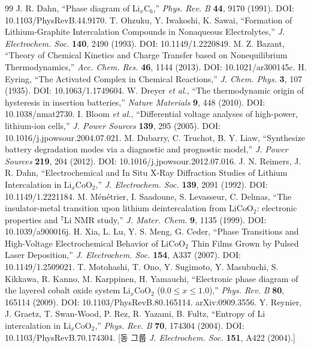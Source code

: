 \documentclass[11pt,a4paper]{article}
\begin{document}
\begin{thebibliography}{99}
 J. R. Dahn, ``Phase diagram of Li$_x$C$_6$,'' \emph{Phys. Rev. B} \textbf{44}, 9170 (1991). DOI: 10.1103/PhysRevB.44.9170.
 T. Ohzuku, Y. Iwakoshi, K. Sawai, ``Formation of Lithium-Graphite Intercalation Compounds in Nonaqueous Electrolytes,'' \emph{J. Electrochem. Soc.} \textbf{140}, 2490 (1993). DOI: 10.1149/1.2220849.
 M. Z. Bazant, ``Theory of Chemical Kinetics and Charge Transfer based on Nonequilibrium Thermodynamics,'' \emph{Acc. Chem. Res.} \textbf{46}, 1144 (2013). DOI: 10.1021/ar300145c.
 H. Eyring, ``The Activated Complex in Chemical Reactions,'' \emph{J. Chem. Phys.} \textbf{3}, 107 (1935). DOI: 10.1063/1.1749604.
 W. Dreyer \emph{et al.}, ``The thermodynamic origin of hysteresis in insertion batteries,'' \emph{Nature Materials} \textbf{9}, 448 (2010). DOI: 10.1038/nmat2730.
 I. Bloom \emph{et al.}, ``Differential voltage analyses of high-power, lithium-ion cells,'' \emph{J. Power Sources} \textbf{139}, 295 (2005). DOI: 10.1016/j.jpowsour.2004.07.021.
 M. Dubarry, C. Truchot, B. Y. Liaw, ``Synthesize battery degradation modes via a diagnostic and prognostic model,'' \emph{J. Power Sources} \textbf{219}, 204 (2012). DOI: 10.1016/j.jpowsour.2012.07.016.
 J. N. Reimers, J. R. Dahn, ``Electrochemical and In Situ X-Ray Diffraction Studies of Lithium Intercalation in Li$_x$CoO$_2$,'' \emph{J. Electrochem. Soc.} \textbf{139}, 2091 (1992). DOI: 10.1149/1.2221184.
 M. M{\'e}n{\'e}trier, I. Saadoune, S. Levasseur, C. Delmas, ``The insulator-metal transition upon lithium deintercalation from LiCoO$_2$: electronic properties and $^7$Li NMR study,'' \emph{J. Mater. Chem.} \textbf{9}, 1135 (1999). DOI: 10.1039/a900016j.
 H. Xia, L. Lu, Y. S. Meng, G. Ceder, ``Phase Transitions and High-Voltage Electrochemical Behavior of LiCoO$_2$ Thin Films Grown by Pulsed Laser Deposition,'' \emph{J. Electrochem. Soc.} \textbf{154}, A337 (2007). DOI: 10.1149/1.2509021.
 T. Motohashi, T. Ono, Y. Sugimoto, Y. Masubuchi, S. Kikkawa, R. Kanno, M. Karppinen, H. Yamauchi, ``Electronic phase diagram of the layered cobalt oxide system Li$_x$CoO$_2$ ($0.0\le x\le1.0$),'' \emph{Phys. Rev. B} \textbf{80}, 165114 (2009). DOI: 10.1103/PhysRevB.80.165114. arXiv:0909.3556.
 Y. Reynier, J. Graetz, T. Swan-Wood, P. Rez, R. Yazami, B. Fultz, ``Entropy of Li intercalation in Li$_x$CoO$_2$,'' \emph{Phys. Rev. B} \textbf{70}, 174304 (2004). DOI: 10.1103/PhysRevB.70.174304. [동 그룹 \emph{J. Electrochem. Soc.} \textbf{151}, A422 (2004).]

\end{thebibliography}
\end{document}
